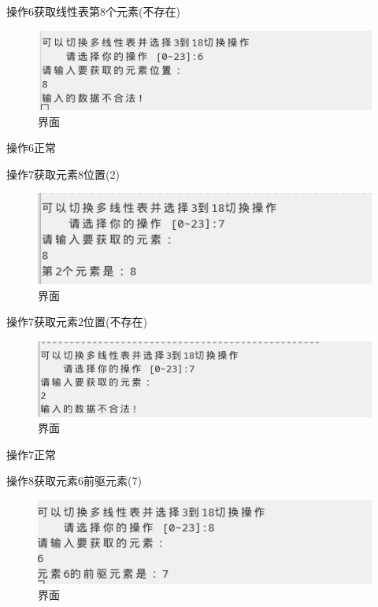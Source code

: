 \documentclass[supercite]{Experimental_Report}
\theoremstyle{definition}
\begin{document}
操作6获取线性表第8个元素(不存在)

\begin{figure}[!htb]
	\begin{center}
		\includegraphics[scale=0.60]{images/1-15.png}
		\caption{界面}
		\label{fig1-15}
		\end{center}
\end{figure}

操作6正常

操作7获取元素8位置(2)

\begin{figure}[!htb]
	\begin{center}
		\includegraphics[scale=0.60]{images/1-16.png}
		\caption{界面}
		\label{fig1-16}
		\end{center}
\end{figure}

操作7获取元素2位置(不存在)

\begin{figure}[!htb]
	\begin{center}
		\includegraphics[scale=0.60]{images/1-17.png}
		\caption{界面}
		\label{fig1-17}
		\end{center}
\end{figure}

操作7正常

操作8获取元素6前驱元素(7)

\begin{figure}[!htb]
	\begin{center}
		\includegraphics[scale=0.60]{images/1-18.png}
		\caption{界面}
		\label{fig1-18}
		\end{center}
\end{figure}
\end{document}

